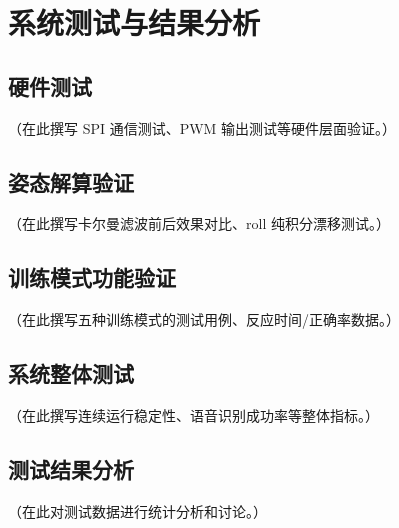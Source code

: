 \chapter{系统测试与结果分析}

\section{硬件测试}
（在此撰写 SPI 通信测试、PWM 输出测试等硬件层面验证。）

\section{姿态解算验证}
（在此撰写卡尔曼滤波前后效果对比、roll 纯积分漂移测试。）

\section{训练模式功能验证}
（在此撰写五种训练模式的测试用例、反应时间/正确率数据。）

\section{系统整体测试}
（在此撰写连续运行稳定性、语音识别成功率等整体指标。）

\section{测试结果分析}
（在此对测试数据进行统计分析和讨论。）
